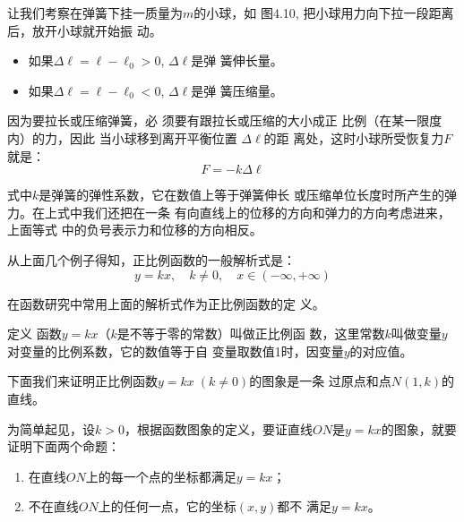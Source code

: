 \begin{figure}[htp]
    \centering
{}
    \caption{}
\end{figure}
\begin{example}
    让我们考察在弹簧下挂一质量为$m$的小球，如
图4.10, 把小球用力向下拉一段距离后，放开小球就开始振
动。
\begin{itemize}
    \item 如果$\Delta \ell=\ell-\ell_0>0$, $\Delta \ell$是弹
簧伸长量。
\item 如果$\Delta \ell=\ell-\ell_0<0$, $\Delta \ell$是弹
簧压缩量。
\end{itemize}

因为要拉长或压缩弹簧，必
须要有跟拉长或压缩的大小成正
比例（在某一限度内）的力，因此
当小球移到离开平衡位置 $\Delta \ell$的距
离处，这时小球所受恢复力$F$就是：
\[F=-k \Delta \ell\]

式中$k$是弹簧的弹性系数，它在数值上等于弹簧伸长
或压缩单位长度时所产生的弹力。在上式中我们还把在一条
有向直线上的位移的方向和弹力的方向考虑进来，上面等式
中的负号表示力和位移的方向相反。
\end{example}

从上面几个例子得知，正比例函数的一般解析式是：
\[y=kx,\quad  k\ne 0,\quad  x\in(-\infty,+\infty)\]

在函数研究中常用上面的解析式作为正比例函数的定
义。

\begin{blk}{定义}
    函数$y=kx$（$k$是不等于零的常数）叫做正比例函
数，这里常数$k$叫做变量$y$对变量的比例系数，它的数值等于自
变量取数值1时，因变量$y$的对应值。
\end{blk}

下面我们来证明正比例函数$y=kx\; (k\ne 0)$的图象是一条
过原点和点$N(1,k)$的直线。

为简单起见，设$k>0$，根据函数图象的定义，要证直线$ON$是$y=kx$的图象，就要证明下面两个命题：
\begin{enumerate}
    \item 在直线$ON$上的每一个点的坐标都满足$y=kx$；
    \item 不在直线$ON$上的任何一点，它的坐标$(x,y)$都不
满足$y=kx$。
\end{enumerate}

